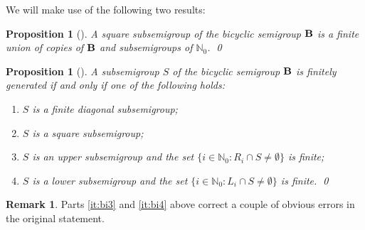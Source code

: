 \documentclass[reqno]{amsart}
\theoremstyle{plain}
\newtheorem{prop}[lem]{Proposition}
\theoremstyle{definition}
\newtheorem{rmk}[lem]{Remark}
\DeclareMathOperator{\B}{\textup{\textbf{B}}}
\newenvironment{thmenumerate}{\begin{enumerate}[topsep=0mm, leftmargin=14mm,itemsep=1mm,label=\textup{(\roman*)}]
}{\end{enumerate}}
\numberwithin{equation}{section}
\begin{document}
We will make use of the following two results:

\begin{prop}[{\cite[Theorem 7.6]{DescalcoRuskuc2005}}]
\label{prop:bisquare}
A square subsemigroup of the bicyclic semigroup $\B$ is a finite union of copies of $\B$ and subsemigroups of $\mathbb{N}_0$. \hfill\qed
\end{prop}

\begin{prop}[{\cite[Theorem 2.1]{DescalcoRuskuc2008}}]
\label{prop:bifinite}
A subsemigroup $S$ of the bicyclic semigroup $\B$ is finitely generated if and only if one of the following holds: 
\begin{thmenumerate}
    \item \label{it:bi1} $S$ is a finite diagonal subsemigroup;
    \item \label{it:bi2} $S$ is a square subsemigroup;
    \item \label{it:bi3} $S$ is an upper subsemigroup and the set $\{i\in\mathbb{N}_0 : R_i\cap S\neq\emptyset
    \}$ is finite;
    \item \label{it:bi4} $S$ is a lower subsemigroup and the set $\{i\in\mathbb{N}_0 : L_i\cap S\neq\emptyset\}$ is finite. \hfill\qed
\end{thmenumerate}
\end{prop}

\begin{rmk}
Parts \ref{it:bi3} and \ref{it:bi4} above correct a couple of obvious errors in the original  statement.
\end{rmk}
\end{document}
